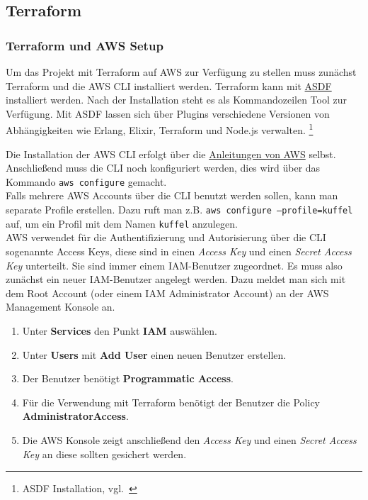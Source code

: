 \newpage
\subsection{Terraform}\label{implementierung_terraform}

\subsubsection{Terraform und AWS Setup}

Um das Projekt mit Terraform auf AWS zur Verfügung zu stellen muss zunächst Terraform und die AWS CLI installiert werden.
Terraform kann mit \hyperref[lst:terraform_setup]{ASDF} installiert werden.
Nach der Installation steht es als Kommandozeilen Tool zur Verfügung.
Mit ASDF lassen sich über Plugins verschiedene Versionen von Abhängigkeiten wie Erlang, Elixir, Terraform und Node.js verwalten.
\footnote{{ASDF Installation, vgl.~\cite{ASDF}}}

Die Installation der AWS CLI erfolgt über die \href{https://docs.aws.amazon.com/cli/latest/userguide/install-cliv2-linux.html}{Anleitungen von AWS} selbst.
Anschließend muss die CLI noch konfiguriert werden, dies wird über das Kommando \texttt{aws configure} gemacht. \\

Falls mehrere AWS Accounts über die CLI benutzt werden sollen, kann man separate Profile erstellen.
Dazu ruft man z.B. \texttt{aws configure --profile=kuffel} auf, um ein Profil mit dem Namen \texttt{kuffel} anzulegen. \\

AWS verwendet für die Authentifizierung und Autorisierung über die CLI sogenannte Access Keys, diese sind in einen \textsl{Access Key} und einen \textsl{Secret Access Key} unterteilt.
Sie sind immer einem IAM-Benutzer zugeordnet.
Es muss also zunächst ein neuer IAM-Benutzer angelegt werden.
Dazu meldet man sich mit dem Root Account (oder einem IAM Administrator Account) an der AWS Management Konsole an.

\begin{enumerate}
  \item Unter \textbf{Services} den Punkt \textbf{IAM} auswählen.
  \item Unter \textbf{Users} mit \textbf{Add User} einen neuen Benutzer erstellen.
  \item Der Benutzer benötigt \textbf{Programmatic Access}.
  \item Für die Verwendung mit Terraform benötigt der Benutzer die Policy \textbf{AdministratorAccess}.
  \item Die AWS Konsole zeigt anschließend den \textsl{Access Key} und einen \textsl{Secret Access Key} an diese sollten gesichert werden.
\end{enumerate}

